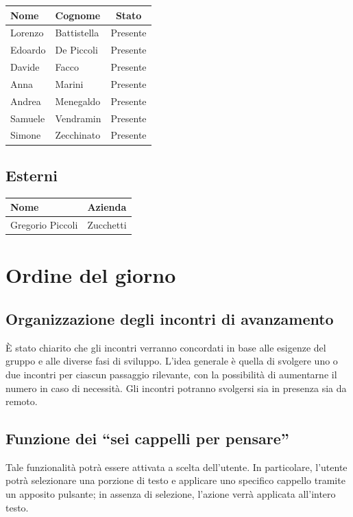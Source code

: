 \documentclass[a4paper, 10pt, colorlinks=true, linkcolor=black, urlcolor=blue, citecolor=blue, hidelinks]{article}
\begin{document}
\begin{center}
\begin{tabular}{|l|l|c|}
\hline
\textbf{Nome} & \textbf{Cognome} & \textbf{Stato} \\
\hline
Lorenzo & Battistella & Presente \\
Edoardo & De Piccoli & Presente \\
Davide & Facco & Presente \\
Anna & Marini & Presente \\
Andrea & Menegaldo & Presente \\
Samuele & Vendramin & Presente \\
Simone & Zecchinato & Presente \\
\hline
\end{tabular}
\end{center}

\subsection{Esterni}

\begin{center}
\begin{tabular}{|l|l|}
\hline
\textbf{Nome} & \textbf{Azienda} \\
\hline
Gregorio Piccoli & Zucchetti \\
\hline
\end{tabular}
\end{center}

\section{Ordine del giorno}

\subsection{Organizzazione degli incontri di avanzamento}
È stato chiarito che gli incontri verranno concordati in base alle esigenze del gruppo e alle diverse fasi di sviluppo. L'idea generale è quella di svolgere uno o due incontri per ciascun passaggio rilevante, con la possibilità di aumentarne il numero in caso di necessità. Gli incontri potranno svolgersi sia in presenza sia da remoto.

\subsection{Funzione dei ``sei cappelli per pensare''}
Tale funzionalità potrà essere attivata a scelta dell'utente. In particolare, l'utente potrà selezionare una porzione di testo e applicare uno specifico cappello tramite un apposito pulsante; in assenza di selezione, l'azione verrà applicata all'intero testo.
\end{document}
